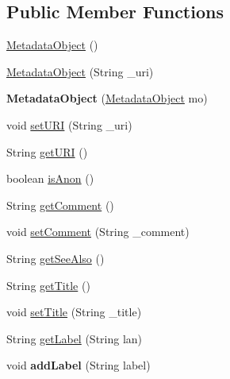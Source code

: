 \subsection*{Public Member Functions}
\begin{DoxyCompactItemize}
\item 
\hyperlink{classodrlmodel_1_1_metadata_object_ab20ea9ece315fa929f47f313c059bb42}{Metadata\-Object} ()
\item 
\hyperlink{classodrlmodel_1_1_metadata_object_a59826bb9a0a9b909b678df4b77008da6}{Metadata\-Object} (String \-\_\-uri)
\item 
\hypertarget{classodrlmodel_1_1_metadata_object_afbc4bcbdf43b341dfcf86e4da445a761}{{\bfseries Metadata\-Object} (\hyperlink{classodrlmodel_1_1_metadata_object}{Metadata\-Object} mo)}\label{classodrlmodel_1_1_metadata_object_afbc4bcbdf43b341dfcf86e4da445a761}

\item 
void \hyperlink{classodrlmodel_1_1_metadata_object_a96bef82bcc0de38aa165c00a6d9d88ec}{set\-U\-R\-I} (String \-\_\-uri)
\item 
String \hyperlink{classodrlmodel_1_1_metadata_object_afe61238df68030c918bf377b91f1f605}{get\-U\-R\-I} ()
\item 
boolean \hyperlink{classodrlmodel_1_1_metadata_object_ae676c6e5f0186acf18bc1426911e16d7}{is\-Anon} ()
\item 
String \hyperlink{classodrlmodel_1_1_metadata_object_a943dfa2720e7c0e773342b6cbec7260f}{get\-Comment} ()
\item 
void \hyperlink{classodrlmodel_1_1_metadata_object_a02b92f7cd561bdbcbf09105a05c6ccbc}{set\-Comment} (String \-\_\-comment)
\item 
String \hyperlink{classodrlmodel_1_1_metadata_object_aef4d6c99e851dc83ccbd1c0672f20ece}{get\-See\-Also} ()
\item 
String \hyperlink{classodrlmodel_1_1_metadata_object_a860de3957bd474683a35f941f1fdc954}{get\-Title} ()
\item 
void \hyperlink{classodrlmodel_1_1_metadata_object_a039dbb6c7887bb53552499bafd42ec54}{set\-Title} (String \-\_\-title)
\item 
String \hyperlink{classodrlmodel_1_1_metadata_object_a9c46072af25fbfc67d14b6329df400ab}{get\-Label} (String lan)
\item 
\hypertarget{classodrlmodel_1_1_metadata_object_ae0abd5d1d2b132dc12bc887f18d8f10e}{void {\bfseries add\-Label} (String label)}\label{classodrlmodel_1_1_metadata_object_ae0abd5d1d2b132dc12bc887f18d8f10e}


\end{DoxyCompactItemize}

